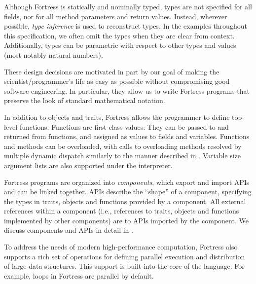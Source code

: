 Although Fortress is statically and nominally typed,
types are not specified for all fields,
nor for all method parameters and return values.
Instead, wherever possible,
\emph{type inference}
is used
to reconstruct types.
In the examples throughout this specification,
we often omit the types when they are clear from context.
Additionally, types can be parametric with respect to other
types and values (most notably natural numbers).

These design decisions are motivated in part
by our goal
of making the scientist/programmer's life as easy as possible
without compromising good software engineering.
In particular,
they allow us to write Fortress programs
that preserve the look of standard
mathematical notation.

In addition to objects and traits,
Fortress allows the programmer to define top-level functions.
Functions are first-class values:
They can be passed to and returned from functions,
and assigned as values to fields and variables.
Functions and methods can be overloaded, with calls
to overloading methods resolved by multiple dynamic dispatch
similarly to the manner described in \cite{MillsteinChambers}.
\label{nutshellKwd}
Variable size argument lists
are also supported under the interpreter.



Fortress programs are organized into
\emph{components},
which export and import APIs
and can be linked together.
APIs describe the ``shape'' of a component,
specifying the types in traits, objects and functions
provided by a component.
All external references within a component
(i.e., references to traits, objects and functions
implemented by other components)
are to APIs imported by the component.
We discuss components and APIs in detail
in .

To address the needs of modern high-performance computation,
Fortress also supports a rich set of operations for defining parallel execution
and distribution
of large data structures. This support is built into the core of the language.
For example,  loops in Fortress are parallel by default.
